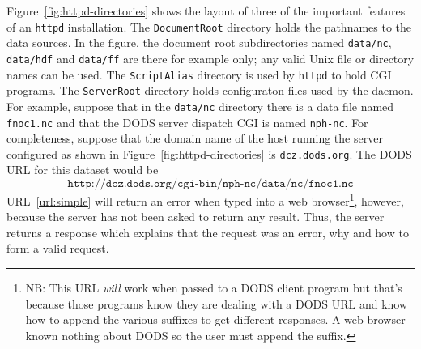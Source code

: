 \documentclass{article}
\newcommand{\httpd}{\texttt{httpd}\xspace}
\begin{document}
Figure~\ref{fig:httpd-directories} shows the layout of three of the important
features of an \httpd installation. The \texttt{DocumentRoot} directory holds
the pathnames to the data sources. In the figure, the document root
subdirectories named \texttt{data/nc}, \texttt{data/hdf} and \texttt{data/ff}
are there for example only; any valid Unix file or directory names can be
used.  The \texttt{ScriptAlias} directory is used by \httpd to hold CGI
programs.  The \texttt{ServerRoot} directory holds configuraton files used by
the daemon.  For example, suppose that in the \texttt{data/nc} directory
there is a data file named \texttt{fnoc1.nc} and that the DODS server
dispatch CGI is named \texttt{nph-nc}.  For completeness, suppose that the
domain name of the host running the server configured as shown in
Figure~\ref{fig:httpd-directories} is \texttt{dcz.dods.org}. The DODS URL for
this dataset would be
\begin{equation}
\texttt{http://dcz.dods.org/cgi-bin/nph-nc/data/nc/fnoc1.nc}
\label{url:simple}
\end{equation}
URL~\ref{url:simple} will return an error when typed into a web
browser\footnote{NB: This URL \emph{will} work when passed to a DODS client
  program but that's because those programs know they are dealing with a DODS
  URL and know how to append the various suffixes to get different responses.
  A web browser known nothing about DODS so the user must append the
  suffix.}, however, because the server has not been asked to return any
result. Thus, the server returns a response which explains that the request
was an error, why and how to form a valid request.
\end{document}
